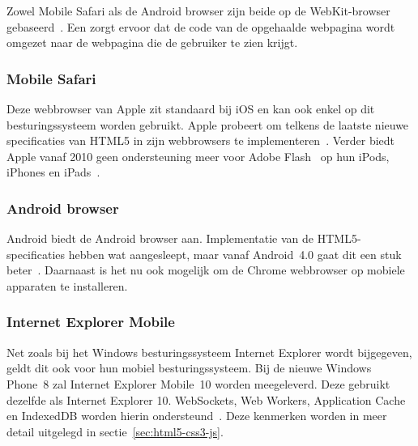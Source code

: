 Zowel Mobile Safari als de Android browser zijn beide op de WebKit-browser  gebaseerd~\cite{Oeflman2011}. 
Een  zorgt ervoor dat de code van de opgehaalde webpagina wordt omgezet naar de webpagina die de gebruiker te zien krijgt. 

\begin{table}
\centering
{}
\caption{Marktaandeel mobiele webbrowsers in mei 2013~\cite{NetApplications2012}.}
\label{tabel:marktaandeel-browsers}
\end{table}

\subsubsection{Mobile Safari}
\label{sec:mobile-safari}
Deze webbrowser van Apple zit standaard bij iOS en kan ook enkel op dit besturingssysteem worden gebruikt. 
Apple probeert om telkens de laatste nieuwe specificaties van HTML5 in zijn webbrowsers te implementeren~\cite{Hales2012}. 
Verder biedt Apple vanaf 2010 geen ondersteuning meer voor Adobe Flash~\cite{Adobe2013} op hun iPods, iPhones en iPads~\cite{Jobs2010}.

\subsubsection{Android browser}
\label{sec:android-browser}
Android biedt de Android browser aan. 
Implementatie van de HTML5-specificaties hebben wat aangesleept, maar vanaf Android~4.0 gaat dit een stuk beter~\cite{Hales2012}. 
Daarnaast is het nu ook mogelijk om de Chrome webbrowser op mobiele apparaten te installeren.

\subsubsection{Internet Explorer Mobile}
Net zoals bij het Windows besturingssysteem Internet Explorer wordt bijgegeven, geldt dit ook voor hun mobiel besturingssysteem. 
Bij de nieuwe Windows Phone~8 zal Internet Explorer Mobile~10 worden meegeleverd. 
Deze gebruikt dezelfde  als Internet Explorer 10. 
WebSockets, Web Workers, Application Cache en IndexedDB worden hierin ondersteund~\cite{Hales2012}.
Deze kenmerken worden in meer detail uitgelegd in sectie~\ref{sec:html5-css3-js}.

